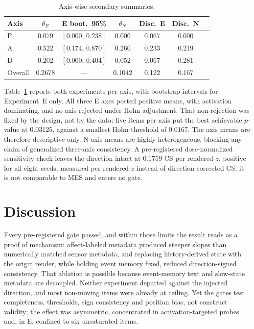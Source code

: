 \documentclass[sigconf]{acmart}
\begin{document}
\begin{table}[H]
  \caption{Axis-wise secondary summaries.}
  \label{tab:axis}
  \centering
  \small
  \setlength{\tabcolsep}{2.8pt}
  \begin{tabular}{@{}lcccccc@{}}
    \toprule
    Axis & $\theta_E$ & E boot.\ 95\% & $\theta_N$ & Disc.\ E & Disc.\ N \\
    \midrule
    P & 0.079 & $[0.000,\,0.238]$ & 0.000 & 0.067 & 0.000 \\
    A & 0.522 & $[0.174,\,0.870]$ & 0.260 & 0.233 & 0.219 \\
    D & 0.202 & $[0.000,\,0.404]$ & 0.052 & 0.067 & 0.281 \\
    Overall & 0.2678 & --- & 0.1042 & 0.122 & 0.167 \\
    \bottomrule
  \end{tabular}
\end{table}

Table~\ref{tab:axis} reports both experiments per axis, with bootstrap intervals for Experiment~E only. All three E axes posted positive means, with activation dominating, and no axis rejected under Holm adjustment. That non-rejection was fixed by the design, not by the data: five items per axis put the best achievable $p$-value at $0.03125$, against a smallest Holm threshold of $0.0167$. The axis means are therefore descriptive only. N axis means are highly heterogeneous, blocking any claim of generalized three-axis consistency. A pre-registered dose-normalized sensitivity check leaves the direction intact at $0.1759$ CS per rendered-$z$, positive for all eight seeds; measured per rendered-$z$ instead of direction-corrected CS, it is not comparable to MES and enters no gate.

\section{Discussion}

Every pre-registered gate passed, and within those limits the result reads as a proof of mechanism: affect-labeled metadata produced steeper slopes than numerically matched sensor metadata, and replacing history-derived state with the origin render, while holding event memory fixed, reduced direction-signed consistency. That ablation is possible because event-memory text and slow-state metadata are decoupled. Neither experiment departed against the injected direction, and most non-moving items were already at ceiling. Yet the gates test completeness, thresholds, sign consistency and position bias, not construct validity; the effect was asymmetric, concentrated in activation-targeted probes and, in E, confined to six unsaturated items.
\end{document}
